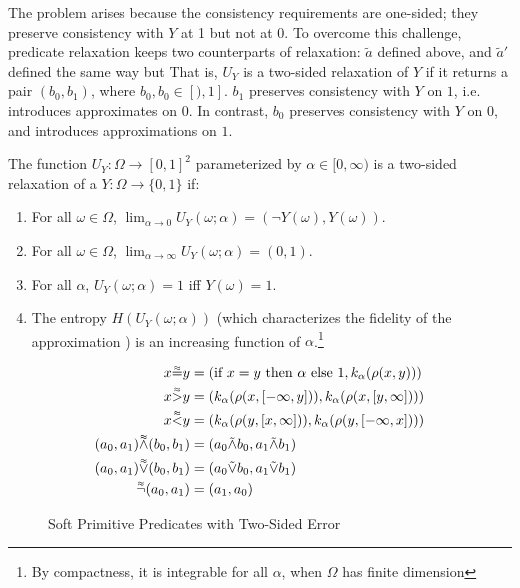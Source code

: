 The problem arises because the consistency requirements are one-sided; they preserve consistency with $Y$ at 1 but not at 0.
To overcome this challenge, predicate relaxation keeps two counterparts of relaxation: $\tilde{a}$ defined above, and $\tilde{a}'$ defined the same way but That is, $U_Y$ is a two-sided relaxation of $Y$ if it returns a pair $(b_0, b_1)$, where $b_0, b_0 \in [), 1]$.
$b_1$ preserves consistency with $Y$ on $1$, i.e. introduces approximates on $0$.
In contrast, $b_0$ preserves consistency with $Y$ on $0$, and introduces approximations on $1$.

\begin{definition}
The function $U_Y : \Omega \to [0, 1]^2$ parameterized by $\alpha \in [0, \infty)$ is a two-sided relaxation of a $Y: \Omega \to \{0, 1\}$ if:
\begin{enumerate}[label=(\roman*)]
	\label{def:temp}
	\item For all $\omega \in \Omega$, $\lim_{\alpha \to 0}U_Y(\omega; \alpha) = (\neg Y(\omega), Y(\omega))$.
	\item For all $\omega \in \Omega$, $\lim_{\alpha \to \infty}U_Y(\omega; \alpha) = (0, 1)$.

    \item For all $\alpha$, $U_Y(\omega; \alpha) = 1$ iff $Y(\omega) = 1$.
    \item The entropy $H(U_Y(\omega; \alpha))$ (which characterizes the fidelity of the approximation ) is an increasing function of $\alpha$.\footnote
    {By compactness, it is integrable for all $\alpha$, when $\Omega$ has finite dimension}
\end{enumerate}
\end{definition}


\begin{figure}
\begin{align*}
x \accentset{\approx}{=} y &= (\text{if } x = y  \text{ then } \alpha \text{ else } 1, k_\alpha(\rho(x, y)))\\
x \accentset{\approx}{>} y &= (k_\alpha(\rho(x, [-\infty, y])), k_\alpha(\rho(x, [y, \infty])))\\
x \accentset{\approx}{<} y &= (k_\alpha(\rho(y, [x, \infty])), k_\alpha(\rho(y, [-\infty, x])))\\
(a_0, a_1) \accentset{\approx}{\land} (b_0, b_1) &= (a_0 \tilde{\land} b_0, a_1 \tilde{\land} b_1)\\
(a_0, a_1) \accentset{\approx}{\lor} (b_0, b_1) &= (a_0 \tilde{\lor} b_0, a_1 \tilde{\lor} b_1)\\
\accentset{\approx}{\neg}(a_0, a_1) &= (a_1, a_0)
\end{align*}
\caption{Soft Primitive Predicates with Two-Sided Error}
\end{figure}

